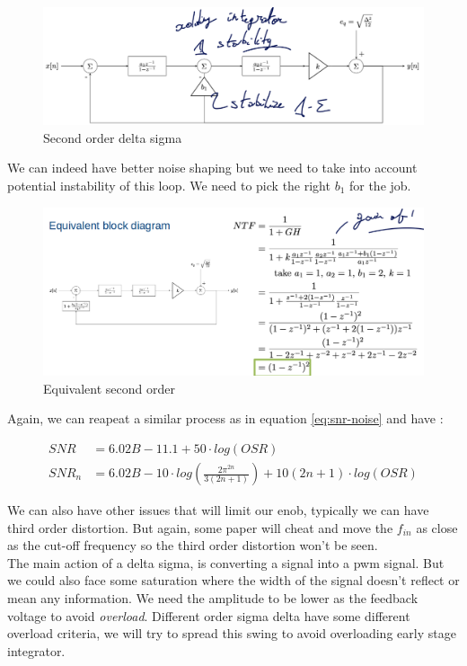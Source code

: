 \documentclass{report}
\begin{document}
\begin{figure}[H]
    \centering
    \includegraphics[width=0.75\linewidth]{second_order.png}
    \caption{Second order delta sigma}
    \label{fig:2-order-label}
\end{figure}

We can indeed have better noise shaping but we need to take into account potential instability of this loop. We need to pick the right $b_1$ for the job.

\begin{figure}[H]
    \centering
    \includegraphics[width=0.75\linewidth]{equi_second_order.png}
    \caption{Equivalent second order}
    \label{fig:equi-2-order-label}
\end{figure}

Again, we can reapeat a similar process as in equation \ref{eq:snr-noise} and have :

\begin{align}
    SNR &= 6.02B-11.1 +50\cdot log(OSR)\\
    SNR_n &= 6.02B- 10\cdot log \left( \frac{2\pi^{2n}}{3(2n+1)} \right) +10(2n+1)\cdot log(OSR)
\end{align}

We can also have other issues that will limit our \gls{enob}, typically we can have third order distortion. But again, some paper will cheat and move the $f_{in}$ as close as the cut-off frequency so the third order distortion won't be seen.\\

The main action of a delta sigma, is converting a signal into a \gls{pwm} signal. But we could also face some saturation where the width of the signal doesn't reflect or mean any information. We need the amplitude to be lower as the feedback voltage to avoid \textit{overload}. Different order sigma delta have some different overload criteria, we will try to spread this swing to avoid overloading early stage integrator.
\end{document}
